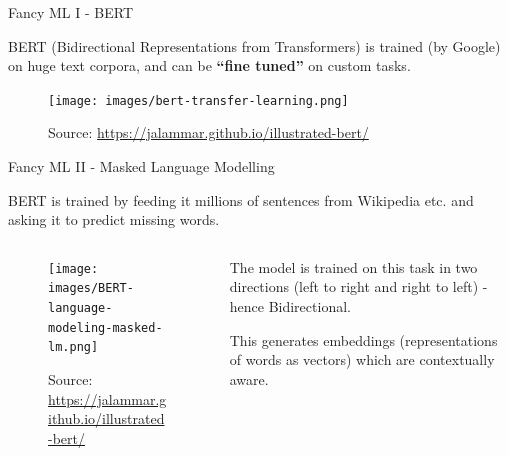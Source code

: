 \documentclass[9pt]{beamer}
\begin{document}
\begin{frame}{Fancy ML I - BERT}

BERT (Bidirectional Representations from Transformers) is trained (by Google) on huge text corpora, and can be \textbf{``fine tuned''} on custom tasks. 

\begin{figure}
	\texttt{[image: images/bert-transfer-learning.png]}
	\caption{Source: \url{https://jalammar.github.io/illustrated-bert/}}
\end{figure}

\end{frame}

\begin{frame}{Fancy ML II - Masked Language Modelling}

BERT is trained by feeding it millions of sentences from Wikipedia etc. and asking it to predict missing words.

\begin{columns}
	\begin{column}{0.618\linewidth}
		\begin{figure}
			\texttt{[image: images/BERT-language-modeling-masked-lm.png]}
			\caption{Source: \url{https://jalammar.github.io/illustrated-bert/}}
		\end{figure}
	\end{column}
	\begin{column}{0.382\linewidth}
		The model is trained on this task in two directions (left to right and right to left) - hence Bidirectional.
		
		\medskip
		
		This generates embeddings (representations of words as vectors) which are contextually aware.
	\end{column}
\end{columns}

\end{frame}
\end{document}
